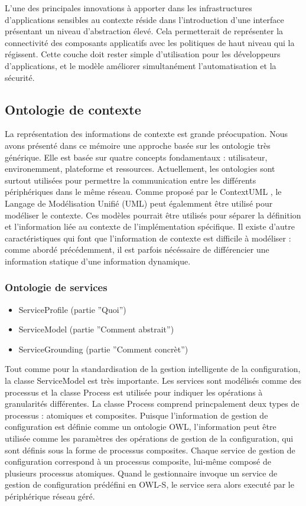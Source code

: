 L'une des principales innovations à apporter dans les infrastructures
d'applications sensibles au contexte réside dans l'introduction d'une interface
présentant un niveau d'abstraction élevé. Cela permetterait de représenter la
connectivité des composants applicatifs avec les politiques de haut niveau qui
la régissent.  Cette couche doit rester simple d'utilisation pour les
développeurs d'applications, et le modèle améliorer simultanément
l'automatisation et la sécurité.

\subsection{Ontologie de contexte}

La représentation des informations de contexte est grande préocupation. Nous
avons présenté dans ce mémoire une approche basée sur les ontologie très
générique. Elle est basée sur quatre concepts fondamentaux : utilisateur,
environemment, plateforme et ressources. Actuellement, les ontologies sont
surtout utilisées pour permettre la communication entre les différents
périphériques dans le même réseau. Comme proposé par le ContextUML
\cite{sheng_contextuml:_2005}, le Langage de Modélisation Unifié (UML) peut
égalemment être utilisé pour modéliser le contexte. Ces modèles pourrait être
utilisés pour séparer la définition et l'information liée au contexte de
l'implémentation spécifique. Il existe d'autre caractéristiques qui font que
l'information de contexte est difficile à modéliser : comme abordé précédemment,
il est parfois nécéssaire de différencier une information statique d'une
information dynamique.

\subsubsection{Ontologie de services}

\begin{itemize}
  \item ServiceProfile (partie ''Quoi'')
  \item ServiceModel (partie ''Comment abstrait'')
  \item ServiceGrounding (partie ''Comment concrèt'')
\end{itemize}

Tout comme pour la standardisation de la gestion intelligente de la
configuration, la classe ServiceModel est très importante. Les services sont
modélisés comme des processus et la classe Process est utilisée pour indiquer
les opérations à granularités différentes. La classe Process comprend
princpalement deux types de processus : atomiques et composites. Puisque
l'information de gestion de configuration est définie comme un ontologie OWL,
l'information peut être utilisée comme les paramètres des opérations de gestion
de la configuration, qui sont définis sous la forme de processus composites.
Chaque service de gestion de configuration correspond à un processus composite,
lui-même composé de plusieurs processus atomiques. Quand le gestionnaire invoque
un service de gestion de configuration prédéfini en OWL-S, le service sera alors
executé par le périphérique réseau géré.

